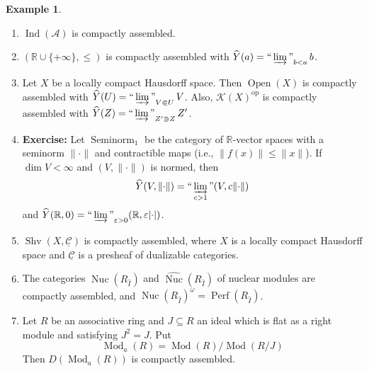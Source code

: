 \documentclass[draft]{amsart}
\newcommand{\RR}{\mathbb{R}}
\newcommand{\ul}[1]{\underline{#1}}
\newcommand{\wh}[1]{\widehat{#1}}
\newcommand{\cat}[1]{\mathcal{#1}}
\newcommand{\ssubset}{\Subset}
\newcommand{\ssupset}{\Supset}
\newcommand{\op}{\mathrm{op}}
\DeclareMathOperator{\Ind}{Ind}
\DeclareMathOperator{\Open}{Open}
\DeclareMathOperator{\Seminorm}{Seminorm}
\DeclareMathOperator{\Shv}{Shv}
\DeclareMathOperator{\Nuc}{Nuc}
\DeclareMathOperator{\Mod}{Mod}
\DeclareMathOperator{\Perf}{Perf}
\DeclareMathOperator*{\indinjlim}{\text{``}\varinjlim\text{''}} %
\theoremstyle{definition}
\newtheorem{ex}[thm]{Example}
\begin{document}
\begin{ex}
\begin{enumerate}[(1)]
\item $\Ind(\cat A)$ is compactly assembled.
\item $(\RR\cup \{+\infty\}, \le)$ is compactly assembled with $\wh{Y}(a) = \indinjlim_{b<a}b$.

\item Let $X$ be a locally compact Hausdorff space. Then $\Open(X)$ is compactly assembled with $\wh{Y}(U) = \indinjlim_{V\ssubset U} V$. Also, $\cat K(X)^{\op}$ is compactly assembled with $\wh{Y}(Z) = \indinjlim_{Z'\ssupset Z} Z'$.

\item \textbf{Exercise:} Let $\Seminorm_1$ be the category of $\RR$-vector spaces with a seminorm $\lVert\cdot\rVert$ and contractible maps (i.e., $\lVert f(x)\rVert \le \lVert x\rVert$). If $\dim V < \infty$ and $(V,\lVert\cdot\rVert)$ is normed, then
\[
\wh{Y}(V,\lVert\cdot\rVert) = \indinjlim_{c>1} (V, c \lVert\cdot\rVert)
\]
and $\wh{Y}(\RR, 0) = \indinjlim_{\varepsilon>0} (\RR,\varepsilon \lvert\cdot\rvert)$.

\item $\Shv(X,\ul{\cat C})$ is compactly assembled, where $X$ is a locally compact Hausdorff space and $\ul{\cat C}$ is a presheaf of dualizable categories.

\item The categories $\Nuc(R_{\wh{I}})$ and $\wh{\Nuc}(R_{\wh{I}})$ of nuclear modules are compactly assembled, and $\Nuc(R_{\wh{I}})^{\omega} = \Perf(R_{\wh{I}})$.

\item Let $R$ be an associative ring and $J\subseteq R$ an ideal which is flat as a right module and satisfying $J^2 = J$. Put
\[
\Mod_a(R) = \Mod(R)/\Mod(R/J)
\]
Then $D(\Mod_a(R))$ is compactly assembled.
\end{enumerate}
\end{ex}
\end{document}
